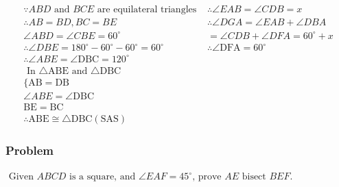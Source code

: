 \documentclass{article}
\begin{document}
$$\begin{array}{ll}
\because A B D \text { and } B C E \text { are equilateral triangles } & \therefore \angle E A B=\angle C D B=x \\
\therefore A B=B D, B C=B E & \therefore \angle D G A=\angle E A B+\angle D B A \\
\angle A B D=\angle C B E=60^{\circ} & =\angle C D B+\angle D F A=60^{\circ}+x \\
\therefore \angle D B E=180^{\circ}-60^{\circ}-60^{\circ}=60^{\circ} & \therefore \angle \mathrm{DFA}=60^{\circ} \\
\therefore \angle A B E=\angle \mathrm{DBC}=120^{\circ} & \\
\text { In } \triangle \mathrm{ABE} \text { and } \triangle \mathrm{DBC} & \\
\{\mathrm{AB}=\mathrm{DB} & \\
\angle A B E=\angle \mathrm{DBC} & \\
\mathrm{BE}=\mathrm{BC} & \\
\therefore \mathrm{ABE} \cong \triangle \mathrm{DBC}(\mathrm{SAS}) &
\end{array}$$
\pagebreak
\subsubsection{Problem}
$\text { Given } ABCD \text { is a square, and } \angle EAF=45^{\circ} \text {, prove } AE \text { bisect } BEF \text {. }$


\end{document}
